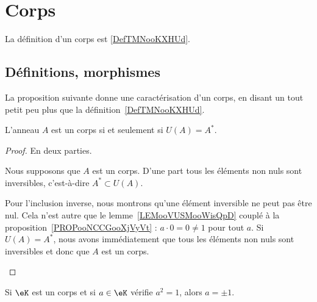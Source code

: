 

\section{Corps}

La définition d'un corps est \ref{DefTMNooKXHUd}.

\subsection{Définitions, morphismes}

La proposition suivante donne une caractérisation d'un corps, en disant un tout petit peu plus que la définition~\ref{DefTMNooKXHUd}.
\begin{proposition}
	L'anneau \( A\) est un corps si et seulement si \( U(A) = A^* \).
\end{proposition}

\begin{proof}
	En deux parties.
	\begin{subproof}
		Nous supposons que \( A\) est un corps. D'une part tous les éléments non nuls sont inversibles, c'est-à-dire \( A^*\subset U(A)\).

		Pour l'inclusion inverse, nous montrons qu'une élément inversible ne peut pas être nul. Cela n'est autre que le lemme~\ref{LEMooVUSMooWisQpD} couplé à la proposition~\ref{PROPooNCCGooXjVyVt} : \( a\cdot 0=0\neq 1\) pour tout \( a\).
		Si \( U(A)=A^*\), nous avons immédiatement que tous les éléments non nuls sont inversibles et donc que \( A\) est un corps.
	\end{subproof}
\end{proof}

\begin{lemma}       \label{LEMooJNIBooAURhrt}
	Si \( \eK\) est un corps et si \( a\in \eK\) vérifie \( a^2=1\), alors \( a=\pm 1\).
\end{lemma}

